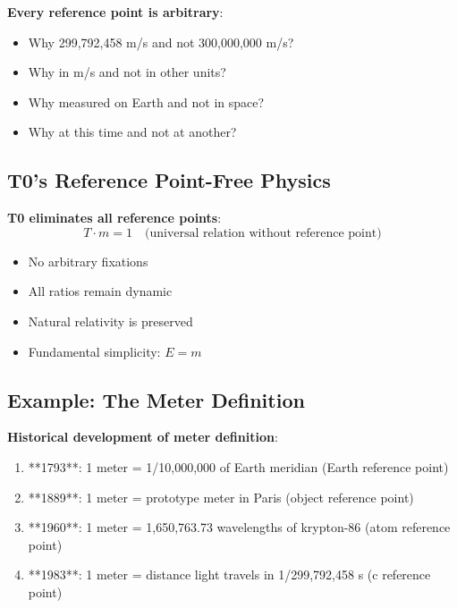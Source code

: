 \documentclass[12pt,a4paper]{article}
\newcommand{\Tfield}{T}
\begin{document}
{{{{{{{								\textbf{Every reference point is arbitrary}:
								\begin{itemize}
									\item Why 299,792,458 m/s and not 300,000,000 m/s?
									\item Why in m/s and not in other units?
									\item Why measured on Earth and not in space?
									\item Why at this time and not at another?
								\end{itemize}
								
								\subsection{T0's Reference Point-Free Physics}
								
								\textbf{T0 eliminates all reference points}:
								\begin{equation}
									\Tfield \cdot m = 1 \quad \text{(universal relation without reference point)}
								\end{equation}
								
								\begin{itemize}
									\item No arbitrary fixations
									\item All ratios remain dynamic
									\item Natural relativity is preserved
									\item Fundamental simplicity: $E = m$
								\end{itemize}
								
								\subsection{Example: The Meter Definition}
								
								\textbf{Historical development of meter definition}:
								\begin{enumerate}
									\item **1793**: 1 meter = 1/10,000,000 of Earth meridian (Earth reference point)
									\item **1889**: 1 meter = prototype meter in Paris (object reference point)  
									\item **1960**: 1 meter = 1,650,763.73 wavelengths of krypton-86 (atom reference point)
									\item **1983**: 1 meter = distance light travels in 1/299,792,458 s (c reference point)
								\end{enumerate}
								
}}}}}}}
\end{document}
